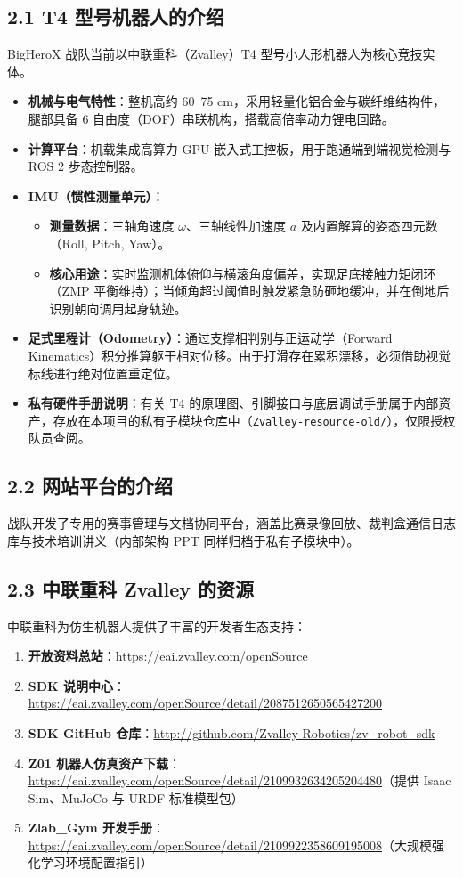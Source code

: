 \documentclass[11pt,a4paper]{ctexart}
\begin{document}
\subsection{2.1 T4 型号机器人的介绍}
BigHeroX 战队当前以中联重科（Zvalley）T4 型号小人形机器人为核心竞技实体。
\begin{itemize}[leftmargin=*]
    \item \textbf{机械与电气特性}：整机高约 60~75 cm，采用轻量化铝合金与碳纤维结构件，腿部具备 6 自由度（DOF）串联机构，搭载高倍率动力锂电回路。
    \item \textbf{计算平台}：机载集成高算力 GPU 嵌入式工控板，用于跑通端到端视觉检测与 ROS 2 步态控制器。
    \item \textbf{IMU（惯性测量单元）}：
    \begin{itemize}
        \item \textbf{测量数据}：三轴角速度 $\omega$、三轴线性加速度 $a$ 及内置解算的姿态四元数（Roll, Pitch, Yaw）。
        \item \textbf{核心用途}：实时监测机体俯仰与横滚角度偏差，实现足底接触力矩闭环（ZMP 平衡维持）；当倾角超过阈值时触发紧急防砸地缓冲，并在倒地后识别朝向调用起身轨迹。
    \end{itemize}
    \item \textbf{足式里程计（Odometry）}：通过支撑相判别与正运动学（Forward Kinematics）积分推算躯干相对位移。由于打滑存在累积漂移，必须借助视觉标线进行绝对位置重定位。
    \item \textbf{私有硬件手册说明}：有关 T4 的原理图、引脚接口与底层调试手册属于内部资产，存放在本项目的私有子模块仓库中（\texttt{Zvalley-resource-old/}），仅限授权队员查阅。
\end{itemize}

\subsection{2.2 网站平台的介绍}
战队开发了专用的赛事管理与文档协同平台，涵盖比赛录像回放、裁判盒通信日志库与技术培训讲义（内部架构 PPT 同样归档于私有子模块中）。

\subsection{2.3 中联重科 Zvalley 的资源}
中联重科为仿生机器人提供了丰富的开发者生态支持：
\begin{enumerate}[leftmargin=*]
    \item \textbf{开放资料总站}：\url{https://eai.zvalley.com/openSource}
    \item \textbf{SDK 说明中心}：\url{https://eai.zvalley.com/openSource/detail/2087512650565427200}
    \item \textbf{SDK GitHub 仓库}：\url{http://github.com/Zvalley-Robotics/zv_robot_sdk}
    \item \textbf{Z01 机器人仿真资产下载}：\url{https://eai.zvalley.com/openSource/detail/2109932634205204480}（提供 Isaac Sim、MuJoCo 与 URDF 标准模型包）
    \item \textbf{Zlab\_Gym 开发手册}：\url{https://eai.zvalley.com/openSource/detail/2109922358609195008}（大规模强化学习环境配置指引）
\end{enumerate}
\end{document}
